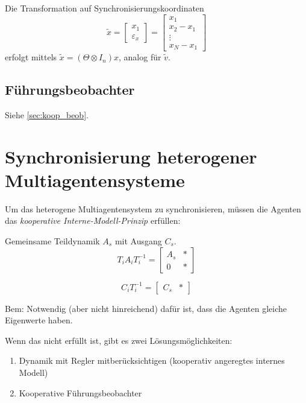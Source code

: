 Die Transformation auf Synchronisierungskoordinaten
\begin{equation}
    \tilde{x}=\begin{bmatrix}
        x_1 \\
        \varepsilon_x
    \end{bmatrix}
    = \begin{bmatrix}
        x_1 \\ x_2-x_1 \\ \vdots \\ x_N-x_1
    \end{bmatrix}
\end{equation}
erfolgt mittels $\tilde{x}=(\Theta \otimes I_n)x$, analog für $\tilde{v}$.


\subsection{Führungsbeobachter}
Siehe \ref{sec:koop_beob}.

\pagebreak
\section{Synchronisierung heterogener Multiagentensysteme}

Um das heterogene Multiagentensystem zu synchronisieren, müssen die Agenten das \emph{kooperative Interne-Modell-Prinzip} erfüllen:

Gemeinsame Teildynamik $A_s$ mit Ausgang $C_s$.
\begin{equation}
    T_i A_i T_i^{-1} = \begin{bmatrix}
        A_s & * \\
        0 & *
    \end{bmatrix}
\end{equation}

\begin{equation}
    C_i T_i^{-1} = \begin{bmatrix}
        C_s & *
    \end{bmatrix}
\end{equation}

Bem: Notwendig (aber nicht hinreichend) dafür ist, dass die Agenten gleiche Eigenwerte haben.

Wenn das nicht erfüllt ist, gibt es zwei Lösungsmöglichkeiten:
\begin{enumerate}
    \item Dynamik mit Regler mitberücksichtigen (kooperativ angeregtes internes Modell)
    \item Kooperative Führungsbeobachter
\end{enumerate}


